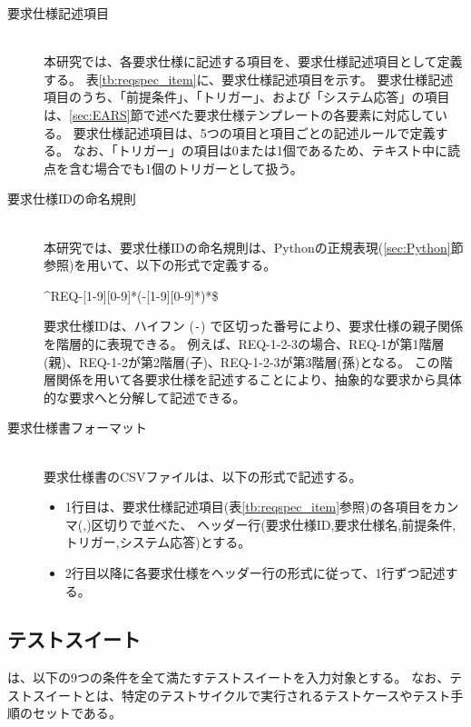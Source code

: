\begin{description}
    \item[要求仕様記述項目]\mbox{}\\
    本研究では、各要求仕様に記述する項目を、要求仕様記述項目として定義する。
    表\ref{tb:reqspec_item}に、要求仕様記述項目を示す。
    要求仕様記述項目のうち、「前提条件」、「トリガー」、および「システム応答」の項目は、\ref{sec:EARS}節で述べた要求仕様テンプレートの各要素に対応している。
    要求仕様記述項目は、5つの項目と項目ごとの記述ルールで定義する。
    なお、「トリガー」の項目は0または1個であるため、テキスト中に読点を含む場合でも1個のトリガーとして扱う。
    
    \item[要求仕様IDの命名規則]\mbox{}\\
    本研究では、要求仕様IDの命名規則は、Pythonの正規表現(\ref{sec:Python}節参照)を用いて、以下の形式で定義する。

    \begin{center}
        \textasciicircum{}REQ-[1-9][0-9]*(-[1-9][0-9]*)*\$
    \end{center}

    要求仕様IDは、ハイフン (\texttt{-}) で区切った番号により、要求仕様の親子関係を階層的に表現できる。
    例えば、REQ-1-2-3の場合、REQ-1が第1階層(親)、REQ-1-2が第2階層(子)、REQ-1-2-3が第3階層(孫)となる。
    この階層関係を用いて各要求仕様を記述することにより、抽象的な要求から具体的な要求へと分解して記述できる。

    \item[要求仕様書フォーマット]\mbox{}\\
    要求仕様書のCSVファイルは、以下の形式で記述する。
    \begin{itemize}
        \item 1行目は、要求仕様記述項目(表\ref{tb:reqspec_item}参照)の各項目をカンマ(,)区切りで並べた、
        ヘッダー行(要求仕様ID,要求仕様名,前提条件,トリガー,システム応答)とする。
        \item 2行目以降に各要求仕様をヘッダー行の形式に従って、1行ずつ記述する。
    \end{itemize}
\end{description}

\subsection{テストスイート}\label{subsec:testsuite}
\tool は、以下の9つの条件を全て満たすテストスイートを入力対象とする。
なお、テストスイートとは、特定のテストサイクルで実行されるテストケースやテスト手順のセットである\cite{istqb_glossary}。

